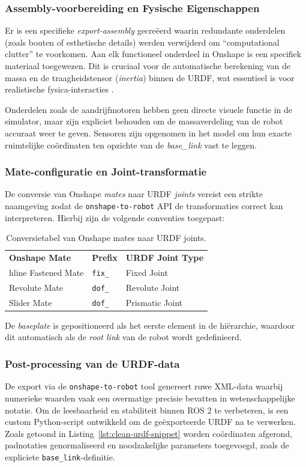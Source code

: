 \subsubsection{Assembly-voorbereiding en Fysische Eigenschappen}
Er is een specifieke \textit{export-assembly} gecreëerd waarin redundante onderdelen (zoals bouten of esthetische details) werden verwijderd om ``computational clutter'' te voorkomen. Aan elk functioneel onderdeel in Onshape is een specifiek materiaal toegewezen. Dit is cruciaal voor de automatische berekening van de massa en de traagheidstensor (\textit{inertia}) binnen de URDF, wat essentieel is voor realistische fysica-interacties \autocite{Tan2018}.

Onderdelen zoals de aandrijfmotoren hebben geen directe visuele functie in de simulator, maar zijn expliciet behouden om de massaverdeling van de robot accuraat weer te geven. Sensoren zijn opgenomen in het model om hun exacte ruimtelijke coördinaten ten opzichte van de \textit{base\_link} vast te leggen.

\subsubsection{Mate-configuratie en Joint-transformatie}
De conversie van Onshape \textit{mates} naar URDF \textit{joints} vereist een strikte naamgeving zodat de \texttt{onshape-to-robot} API de transformaties correct kan interpreteren. Hierbij zijn de volgende conventies toegepast:

\begin{table}[h]
\centering
\begin{tabular}{lll}
\textbf{Onshape Mate} & \textbf{Prefix} & \textbf{URDF Joint Type} \\hline
Fastened Mate         & \texttt{fix\_}  & Fixed Joint              \\
Revolute Mate         & \texttt{dof\_}  & Revolute Joint           \\
Slider Mate           & \texttt{dof\_}  & Prismatic Joint          \\
\end{tabular}
\caption{Conversietabel van Onshape mates naar URDF joints.}
\end{table}

De \textit{baseplate} is gepositioneerd als het eerste element in de hiërarchie, waardoor dit automatisch als de \textit{root link} van de robot wordt gedefinieerd.

\subsubsection{Post-processing van de URDF-data}
De export via de \texttt{onshape-to-robot} tool \autocite{Rhoban2025} genereert ruwe XML-data waarbij numerieke waarden vaak een overmatige precisie bevatten in wetenschappelijke notatie. Om de leesbaarheid en stabiliteit binnen ROS 2 te verbeteren, is een custom Python-script ontwikkeld om de geëxporteerde URDF na te verwerken. Zoals getoond in Listing~\ref{lst:clean-urdf-snippet} worden coördinaten afgerond, padnotaties genormaliseerd en noodzakelijke parameters toegevoegd, zoals de expliciete \texttt{base\_link}-definitie.

